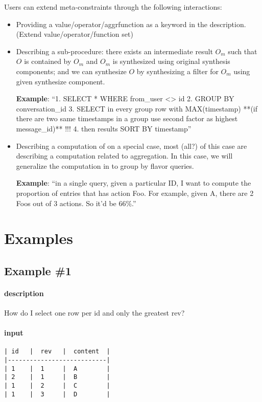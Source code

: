 \documentclass[letter, notitlepage]{article}
\begin{document}
Users can extend meta-constraints through the following interactions:
\begin{itemize}
\item Providing a value/operator/aggrfunction as a keyword in the description. (Extend value/operator/function set)
\item Describing a sub-procedure: there exists an intermediate result $O_m$ such that $O$ is contained by $O_m$ and $O_m$ is synthesized using original synthesis components; and we can synthesize $O$ by synthesizing a filter for $O_m$ using given synthesize component.

\textbf{Example}: ``1. SELECT * WHERE from\_user <> id
2. GROUP BY conversation\_id
3. SELECT in every group row with MAX(timestamp) **(if there are two same timestamps in a group use second factor as highest message\_id)** !!!
4. then results SORT BY timestamp''

\item Describing a computation of on a special case, most (all?) of this case are describing a computation related to aggregation. In this case, we will generalize the computation in to group by flavor queries.

\textbf{Example}: ``in a single query, given a particular ID, I want to compute the proportion of entries that has action Foo. For example, given A, there are 2 Foos out of 3 actions. So it'd be 66\%.''

\end{itemize}

\section{Examples}
\subsection{Example \#1}
\paragraph{description}
	How do I select one row per id and only the greatest rev?

\paragraph{input}
\begin{verbatim}
| id   |  rev   |  content  |
|---------------------------|
| 1    |  1     |  A        |
| 2    |  1     |  B        |
| 1    |  2     |  C        |
| 1    |  3     |  D        |
\end{verbatim}
\end{document}
